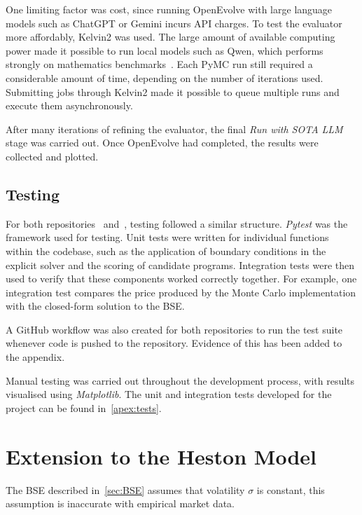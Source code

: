 \documentclass[11pt]{report}
\begin{document}
One limiting factor was cost, since running 
OpenEvolve with large language models such as ChatGPT 
or Gemini incurs API charges. To test the evaluator 
more affordably, Kelvin2 was used. 
The large amount of available computing power made it possible to 
run local models such as Qwen, which performs strongly on 
mathematics benchmarks~\cite{qwen36_35b_a3b}. 
Each PyMC run still required a considerable amount of 
time, depending on the number of iterations used. 
Submitting jobs through Kelvin2 made it possible 
to queue multiple runs and execute them asynchronously.

After many iterations of refining the evaluator,
the final \textit{Run with SOTA LLM} stage was 
carried out. Once OpenEvolve had completed, 
the results were collected and plotted.

\section{Testing}\label{sec:testing}
For both repositories~\cite{heston_estimator} and~\cite{yalcin_finalyearproject},
testing followed a similar structure. \textit{Pytest} was the framework used
for testing. Unit tests were written 
for individual functions within the codebase, such as the
application of boundary conditions in the explicit
solver and the scoring of candidate programs.
Integration tests were then used to verify that
these components worked correctly together. For
example, one integration test compares the price
produced by the Monte Carlo implementation with
the closed-form solution to the BSE.

A GitHub workflow was also created for 
both repositories to run the
test suite whenever code is pushed to the repository.
Evidence of this has been added to the appendix. 

Manual testing was carried out throughout
the development process, with results visualised 
using \textit{Matplotlib}. The unit and integration 
tests developed for the project can be found in~\ref{apex:tests}.

\chapter{Extension to the Heston Model}\label{ch:ExtHeston}
The BSE described in~\ref{sec:BSE} assumes
that volatility $\sigma$ is constant, this assumption
is inaccurate with empirical market data. 
\end{document}
